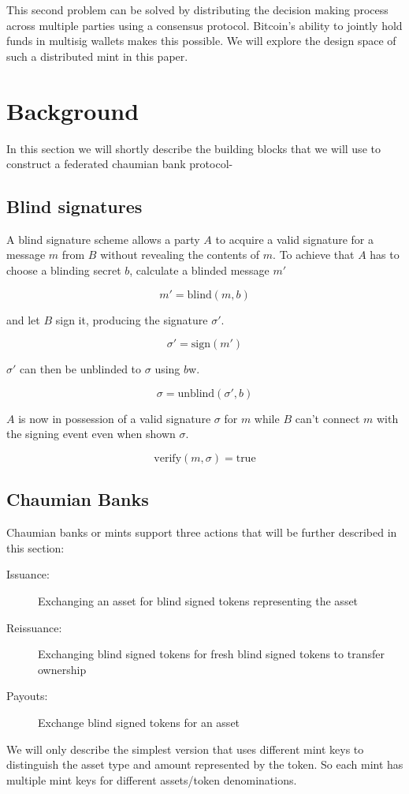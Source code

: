 \documentclass[10pt,a4paper,twocolumn]{article}
\begin{document}
This second problem can be solved by distributing the decision making process across multiple parties using a consensus protocol. Bitcoin's ability to jointly hold funds in multisig wallets makes this possible. We will explore the design space of such a distributed mint in this paper.

\section{Background}
In this section we will shortly describe the building blocks that we will use to construct a federated chaumian bank protocol-
\subsection{Blind signatures}
A blind signature scheme allows a party $A$ to acquire a valid signature for a message $m$ from $B$ without revealing the contents of $m$. To achieve that $A$ has to choose a blinding secret $b$, calculate a blinded message $m'$

\begin{equation*}
	m' = \text{blind}(m, b)
\end{equation*}

and let $B$ sign it, producing the signature $\sigma'$.

\begin{equation*}
	\sigma' = \text{sign}(m')
\end{equation*}

$\sigma'$ can then be unblinded to $\sigma$ using $b$w.

\begin{equation*}
	\sigma = \text{unblind}(\sigma', b)
\end{equation*}

$A$ is now in possession of a valid signature $\sigma$ for $m$ while $B$ can't connect $m$ with the signing event even when shown $\sigma$.

\begin{equation*}
	\text{verify}(m, \sigma) = \text{true}
\end{equation*}


\subsection{Chaumian Banks}
Chaumian banks or mints support three actions that will be further described in this section:
\begin{description}
	\item[Issuance:] Exchanging an asset for blind signed tokens representing the asset
	\item[Reissuance:] Exchanging blind signed tokens for fresh blind signed tokens to transfer ownership
	\item[Payouts:] Exchange blind signed tokens for an asset
\end{description}
We will only describe the simplest version that uses different mint keys to distinguish the asset type and amount represented by the token. So each mint has multiple mint keys for different assets/token denominations.
\end{document}
